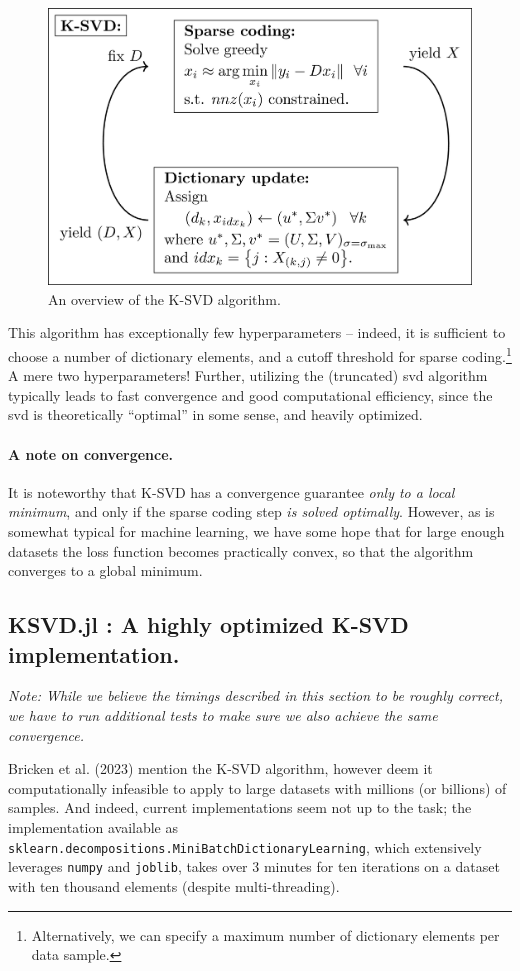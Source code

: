 \documentclass[11pt]{article}
\makeatletter
\newcommand{\cslcitation}[2]
 {\protect\hyper@linkstart{cite}{citeproc_bib_item_#1}#2\hyper@linkend}
\makeatother
\begin{document}
\begin{figure}[htbp]
\centering
\includegraphics[width=.9\linewidth]{./tikz-pictures/ksvd-overview/main.png}
\caption{\label{fig:ksvd-algo}An overview of the K-SVD algorithm.}
\end{figure}

This algorithm has exceptionally few hyperparameters -- indeed, it is sufficient to choose a number of dictionary elements, and a cutoff threshold for sparse coding.\footnote{Alternatively, we can specify a maximum number of dictionary elements per data sample.} A mere two hyperparameters!
Further, utilizing the (truncated) svd algorithm typically leads to fast convergence and good computational efficiency, since the svd is theoretically ``optimal'' in some sense, and heavily optimized.
\paragraph*{A note on convergence.}
\label{sec:orgca643d7}
It is noteworthy that K-SVD has a convergence guarantee \emph{only to a local minimum}, and only if the sparse coding step \emph{is solved optimally}.
However, as is somewhat typical for machine learning, we have some hope that for large enough datasets the loss function becomes practically convex, so that the algorithm converges to a global minimum.
\subsection{KSVD.jl : A highly optimized K-SVD implementation.}
\label{sec:org4498a90}
\emph{Note: While we believe the timings described in this section to be roughly correct, we have to run additional tests to make sure we also achieve the same convergence.}

Bricken et al. (\cslcitation{3}{2023}) mention the K-SVD algorithm, however deem it computationally infeasible to apply to large datasets with millions (or billions) of samples.
And indeed, current implementations seem not up to the task; the implementation available as \texttt{sklearn.decompositions.MiniBatchDictionaryLearning}, which extensively leverages \texttt{numpy} and \texttt{joblib}, takes over 3 minutes for ten iterations on a dataset with ten thousand elements (despite multi-threading).
\end{document}
